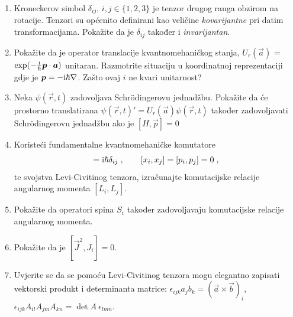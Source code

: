 \begin{enumerate}[label=\arabic{chapter}.\arabic*.]

\item \label{zad:kronecker} Kroneckerov simbol $\delta_{ij}$, $i,j \in \{1, 2, 3\}$ je tenzor drugog ranga
    obzirom na rotacije. Tenzori su općenito definirani kao veličine 
    \emph{kovarijantne} pri datim transformacijama. Pokažite da je $\delta_{ij}$
    također i \emph{invarijantan}. 
\item Pokažite da je operator translacije kvantnomehaničkog stanja,
 $U_{r}(\vec{a})$ = $\exp (-\frac{\rmi}{\hbar} \vec{p}\cdot \vec{a} )$
unitaran. Razmotrite situaciju u koordinatnoj reprezentaciji gdje
je $\vec{p} = -\rmi \hbar \nabla$. Zašto ovaj $i$ ne kvari unitarnost?

\item Neka $\psi(\vec{r}, t)$ zadovoljava Schr\"{o}dingerovu jednadžbu.
Pokažite da će prostorno translatirana $\psi(\vec{r}, t)' = 
U_{r}(\vec{a}) \psi(\vec{r}, t)$ također zadovoljavati Schr\"{o}dingerovu
jednadžbu ako je $[H, \vec{p}] = 0$

\item Koristeći fundamentalne kvantnomehaničke komutatore
\begin{equation}
 [x_i, p_j] = \rmi\hbar \delta_{ij}\;, \qquad
 [x_i, x_j] = [p_i, p_j] = 0 \;,
\end{equation}
te svojstva Levi-Civitinog tenzora, izračunajte komutacijske
relacije angularnog momenta $[L_i, L_j]$.

\item Pokažite da operatori spina $S_i$ također zadovoljavaju komutacijske
relacije angularnog momenta.

\item Pokažite da je $[\vec{J}^2, J_i] = 0$.
\item \label{zad:levicivita} Uvjerite se da se pomoću Levi-Civitinog tenzora mogu elegantno zapisati
    vektorski produkt i determinanta matrice: $\epsilon_{ijk}a_{j}b_{k}
    = (\vec{a}\times\vec{b})_{i}$, $\epsilon_{ijk}A_{il}A_{jm}A_{kn} = \det A \: \epsilon_{lmn}$.
\end{enumerate}
